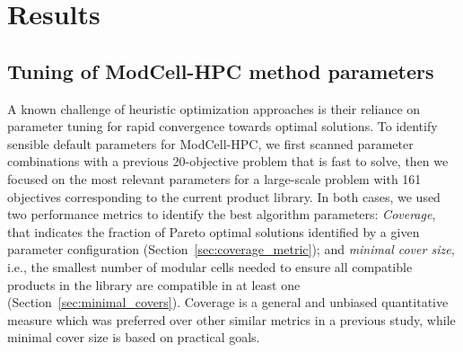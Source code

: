 \documentclass[12pt]{article}
\begin{document}
{\section{Results}

\subsection{Tuning of ModCell-HPC method parameters}

A known challenge of heuristic optimization approaches is their reliance on parameter tuning for rapid convergence towards optimal solutions.
To identify sensible default parameters for ModCell-HPC, we first scanned parameter combinations with a previous\citep{garcia2019} 20-objective problem that is fast to solve, then we focused on the most relevant parameters for a large-scale problem with 161 objectives corresponding to the current product library.
In both cases, we used two performance metrics to identify the best algorithm parameters:
\emph{Coverage}, that indicates the fraction of Pareto optimal solutions identified by a given parameter configuration (Section~\ref{sec:coverage_metric});
and \emph{minimal cover size}, i.e., the smallest number of modular cells needed to ensure all compatible products in the library are compatible in at least one (Section~\ref{sec:minimal_covers}). Coverage is a general and unbiased quantitative measure which was preferred over other similar metrics in a previous study,\citep{garcia2019c} while minimal cover size is based on practical goals.

}
\end{document}
